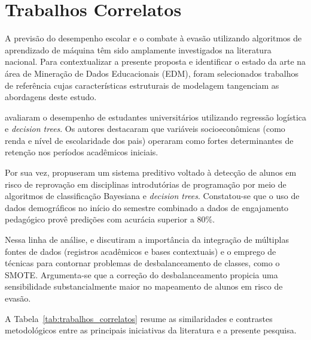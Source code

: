 \chapter{Trabalhos Correlatos}

A previsão do desempenho escolar e o combate à evasão utilizando algoritmos de aprendizado de máquina têm sido amplamente investigados na literatura nacional. Para contextualizar a presente proposta e identificar o estado da arte na área de Mineração de Dados Educacionais (EDM), foram selecionados trabalhos de referência cujas características estruturais de modelagem tangenciam as abordagens deste estudo.

 avaliaram o desempenho de estudantes universitários utilizando regressão logística e \textit{decision trees}. Os autores destacaram que variáveis socioeconômicas (como renda e nível de escolaridade dos pais) operaram como fortes determinantes de retenção nos períodos acadêmicos iniciais.

Por sua vez,  propuseram um sistema preditivo voltado à detecção de alunos em risco de reprovação em disciplinas introdutórias de programação por meio de algoritmos de classificação Bayesiana e \textit{decision trees}. Constatou-se que o uso de dados demográficos no início do semestre combinado a dados de engajamento pedagógico provê predições com acurácia superior a 80\%.

Nessa linha de análise,  e  discutiram a importância da integração de múltiplas fontes de dados (registros acadêmicos e bases contextuais) e o emprego de técnicas para contornar problemas de desbalanceamento de classes, como o SMOTE. Argumenta-se que a correção do desbalanceamento propicia uma sensibilidade substancialmente maior no mapeamento de alunos em risco de evasão.

A Tabela~\ref{tab:trabalhos_correlatos} resume as similaridades e contrastes metodológicos entre as principais iniciativas da literatura e a presente pesquisa.

